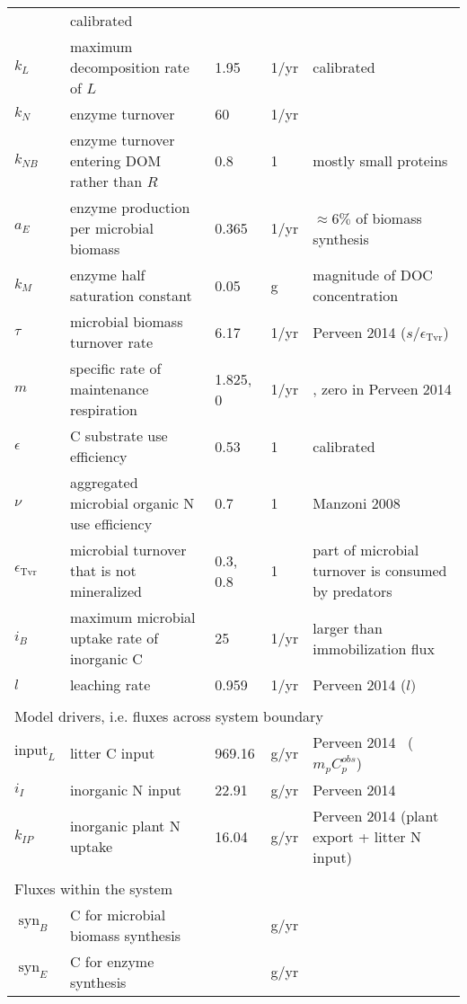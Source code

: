 \begin{table}[t]
\begin{tabular}{lp{6cm}llp{5.5cm}}
& calibrated \\
$k_L$ &  maximum decomposition rate of $L$ &  1.95 & 1/yr
& calibrated \\
$k_N$ &  enzyme turnover &  60 & 1/yr & \citep{Burns13} \\
$k_{NB}$ & enzyme turnover entering DOM rather than $R$ & 
0.8 & 1 & mostly small proteins \\
$a_{E}$ &  enzyme production per microbial biomass & 0.365 &
1/yr & $\approx 6\%$ of biomass synthesis \\ 
$k_{M}$ &  enzyme half saturation constant & 0.05 & g & magnitude of DOC
concentration \\
$\tau$ &  microbial biomass turnover rate & 6.17 & 1/yr & Perveen 2014
($s/\epsilon_{\operatorname{Tvr}}$) \\
$m$ & specific rate of maintenance respiration & 1.825, 0 & 
1/yr & \citep{Bodegom07}, zero in Perveen 2014 \\
$\epsilon$ & C substrate use efficiency & 0.53 &
1 & calibrated \\ %
$\nu$ & aggregated microbial organic N use efficiency & 0.7 &
1 & Manzoni 2008 \\
$\epsilon_{\operatorname{Tvr}}$ & microbial turnover that is not
mineralized & 0.3,\,0.8 & 1 & part of microbial turnover is consumed by
predators
\\
$i_{B}$ & maximum microbial uptake rate of inorganic C & 25 & 1/yr 
& larger than immobilization flux \\
$l$ & leaching rate & 0.959 &
1/yr & Perveen 2014 ($l)$ \\
\\
\multicolumn{5}{l}{Model drivers, i.e. fluxes across system boundary}  \\ 
$\mathrm{input}_{L}$ & litter C input & 969.16 & g/yr 
& Perveen 2014 \, ($m_p C^{obs}_p$)\\
$i_{I}$ & inorganic N input & 22.91 & g/yr 
& Perveen 2014 \\
$k_{IP}$ & inorganic plant N uptake & 16.04 &  g/yr 
& Perveen 2014 (plant export + litter N input)\\
\\
\multicolumn{5}{l}{Fluxes within the system} \\
$\operatorname{syn}_B $ & C for microbial biomass synthesis &  & g/yr &
\\
$\operatorname{syn}_E $ & C for enzyme synthesis &  & g/yr & \\

\end{tabular}
\end{table}
